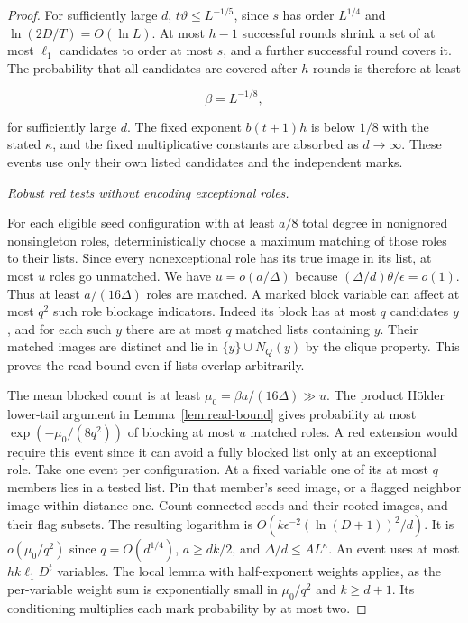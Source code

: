 \documentclass[11pt]{amsart}
\theoremstyle{definition}
\theoremstyle{remark}
\numberwithin{equation}{section}
\begin{document}
\begin{proof}
For sufficiently large $d $, $ t\vartheta\le L^{-1/5}$, since $ s $ has order $ L^{1/4}$ and $\ln(2D/T)=O(\ln L)$. At most $ h-1$ successful rounds shrink a set of at most $\ell_1$ candidates to order at most $ s $, and a further successful round covers it. The probability that all candidates are covered after $ h$ rounds is therefore at least

\begin{equation}
\beta=L^{-1/8},
\end{equation}

for sufficiently large $d $. The fixed exponent $ b(t+1)h $ is below $1/8$ with the stated $\kappa $, and the fixed multiplicative constants are absorbed as $ d\to\infty$. These events use only their own listed candidates and the independent marks.

\medskip\noindent\emph{Robust red tests without encoding exceptional roles.}

For each eligible seed configuration with at least $a/8$ total degree in nonignored nonsingleton roles, deterministically choose a maximum matching of those roles to their lists. Since every nonexceptional role has its true image in its list, at most $ u $ roles go unmatched. We have $ u=o(a/\Delta)$ because $(\Delta/d)\theta/\epsilon=o(1)$. Thus at least $ a/(16\Delta)$ roles are matched. A marked block variable can affect at most $ q^2$ such role blockage indicators. Indeed its block has at most $ q $ candidates $ y $, and for each such $ y $ there are at most $ q $ matched lists containing $ y $. Their matched images are distinct and lie in $\{y\}\cup N_Q(y)$ by the clique property. This proves the read bound even if lists overlap arbitrarily.

The mean blocked count is at least $\mu_0=\beta a/(16\Delta)\gg u $. The product H\"{o}lder lower-tail argument in Lemma~\ref{lem:read-bound} gives probability at most $\exp(-\mu_0/(8q^2))$ of blocking at most $ u $ matched roles. A red extension would require this event since it can avoid a fully blocked list only at an exceptional role. Take one event per configuration. At a fixed variable one of its at most $ q $ members lies in a tested list. Pin that member's seed image, or a flagged neighbor image within distance one. Count connected seeds and their rooted images, and their flag subsets. The resulting logarithm is $ O(k\epsilon^{-2}(\ln(D+1))^2/d)$. It is $ o(\mu_0/q^2)$ since $ q=O(d^{1/4})$, $ a\ge dk/2$, and $\Delta/d\le A L^\kappa $. An event uses at most $ hk\ell_1 D^t $ variables. The local lemma with half-exponent weights applies, as the per-variable weight sum is exponentially small in $\mu_0/q^2$ and $ k\ge d+1$. Its conditioning multiplies each mark probability by at most two.


\end{proof}
\end{document}
